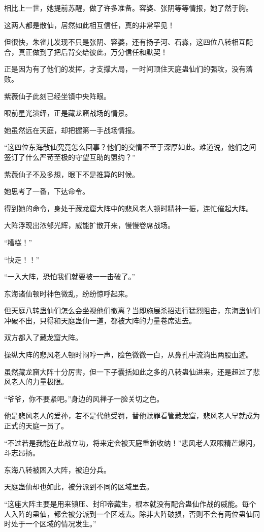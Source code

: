 \begin{this_body}
相比上一世，她提前苏醒，做了许多准备。容婆、张阴等等情报，她了然于胸。

这两人都是散仙，居然如此相互信任，真的非常罕见！

但很快，朱雀儿发现不只是张阴、容婆，还有扬子河、石淼，这四位八转相互配合，真正做到了把后背交给彼此，万分信任和默契！

正是因为有了他们的发挥，才支撑大局，一时间顶住天庭蛊仙们的强攻，没有落败。

紫薇仙子此刻已经坐镇中央阵眼。

眼前星光演绎，正是藏龙窟战场的情景。

她虽然远在天庭，却把握第一手战场情报。

“这四位东海散仙究竟怎么回事？他们的交情不至于深厚如此。难道说，他们之间签订了什么严苛至极的守望互助的盟约？”

紫薇仙子不及多想，眼下不是推算的时候。

她思考了一番，下达命令。

得到她的命令，身处于藏龙窟大阵中的悲风老人顿时精神一振，连忙催起大阵。

大阵浮现出浓郁光辉，威能扩散开来，慢慢卷席战场。

“糟糕！”

“快走！！”

“一入大阵，恐怕我们就要被一一击破了。”

东海诸仙顿时神色微乱，纷纷惊呼起来。

但天庭八转蛊仙们怎么会坐视他们撤离？当即施展杀招进行猛烈阻击，东海蛊仙们冲破不出，只得和天庭蛊仙一道，都被大阵的力量卷席进去。

双方都入了藏龙窟大阵。

操纵大阵的悲风老人顿时闷哼一声，脸色微微一白，从鼻孔中流淌出两股血迹。

虽然藏龙窟大阵十分厉害，但一下子囊括如此之多的八转蛊仙进来，还是超过了悲风老人的力量极限。

“爷爷，你不要紧吧。”身边的风禅子一脸关切之色。

他是悲风老人的爱孙，若不是代他受罚，替他赎罪看管藏龙窟，悲风老人早就成为正式的天庭一员了。

“不过若是我能在此战立功，将来定会被天庭重新收纳！”悲风老人双眼精芒爆闪，斗志昂扬。

东海八转被困入大阵，被迫分兵。

天庭蛊仙却也如此，被分派到不同的区域里去。

“这座大阵主要是用来镇压、封印帝藏生，根本就没有配合蛊仙作战的威能。每个人入阵的蛊仙，都会被分派到一个区域去。除非大阵破损，否则不会有两位蛊仙同时处于一个区域的情况发生。”


\end{this_body}
